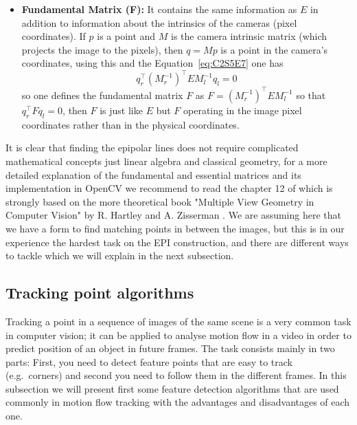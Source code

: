 \begin{itemize}
\item \textbf{Fundamental Matrix (F):} It contains the same information as $E$ in addition to information about the intrinsics of the cameras (pixel coordinates). If $p$ is a point and $M$ is the camera intrinsic matrix (which projects the image to the pixels), then $q=Mp$ is a point in the camera's coordinates, using this and the Equation~\ref{eq:C2S5E7} one has 
\begin{equation}
\label{eq:C2S5E8}
q_r^{\intercal}(M_r^{-1})^{\intercal}E M_l^{-1}q_l=0
\end{equation}
so one defines the fundamental matrix $F$ as $F=(M_r^{-1})^{\intercal}EM_l^{-1}$ so that $q_r^{\intercal}Fq_l=0$, then $F$ is just like $E$ but $F$ operating in the image pixel coordinates rather than in the physical coordinates.
\end{itemize}
It is clear that finding the epipolar lines does not require complicated mathematical concepts just linear algebra and classical geometry, for a more detailed explanation of the fundamental and essential matrices and its implementation in OpenCV we recommend to read the chapter 12 of \cite{LearnOpenCV} which is strongly based on the more theoretical book "Multiple View Geometry in Computer Vision" by R. Hartley and A. Zisserman \cite{MultipleView}. We are assuming here that we have a form to find matching points in between the images, but this is in our experience the hardest task on the EPI construction, and there are different ways to tackle which we will explain in the next subsection. 

\subsection{Tracking point algorithms}
\label{sec:track_alg}

Tracking a point in a sequence of images of the same scene is a very common task in computer vision; it can be applied to analyse motion flow in a video in order to predict position of an object in future frames. The task consists mainly in two parts: First, you need to detect feature points that are easy to track (e.g.\ corners) and second you need to follow them in the different frames. In this subsection we will present first some feature detection algorithms that are used commonly in motion flow tracking with the advantages and disadvantages of each one. 


